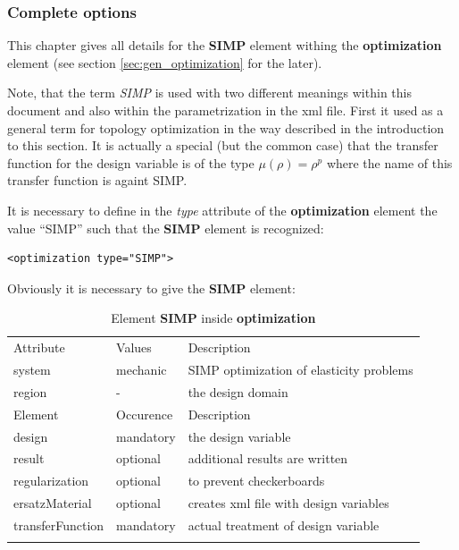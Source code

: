 \subsubsection{Complete options}
This chapter gives all details for the \textbf{SIMP} element withing the
\textbf{optimization} element (see section \ref{sec:gen_optimization} for the later).

Note, that the term \textsl{SIMP} is used with two different meanings within
this document and also within the parametrization in the xml file. First it used
as a general term for topology optimization in the way described in the
introduction to this section. It is actually a special (but the common case) that the transfer function for the design variable is of the type  $\mu(\rho) = \rho^p$ where
the name of this transfer function is againt SIMP.

It is necessary to define in the \textsl{type} attribute of the \textbf{optimization} element the value ``SIMP'' such
that the \textbf{SIMP} element is recognized:
\begin{verbatim}
<optimization type="SIMP">
\end{verbatim}

Obviously it is necessary to give the \textbf{SIMP} element:
\begin{center}
\begin{longtable}{llp{}}
\hline\noalign{\smallskip}
Attribute & Values & Description \\
\noalign{\smallskip}\hline\noalign{\smallskip}
system     & mechanic & SIMP optimization of elasticity problems \\
region     & -        & the design domain \\
\noalign{\smallskip}\hline\noalign{\smallskip}
Element & Occurence & Description \\
\noalign{\smallskip}\hline\noalign{\smallskip}
design & mandatory & the design variable \\
result & optional & additional results are written \\
regularization & optional & to prevent checkerboards \\
ersatzMaterial & optional & creates xml file with design variables \\
transferFunction & mandatory & actual treatment of design variable \\
\noalign{\smallskip}\hline\noalign{\smallskip} 
\caption{Element \textbf{SIMP} inside \textbf{optimization}}
\end{longtable}
\end{center} 

